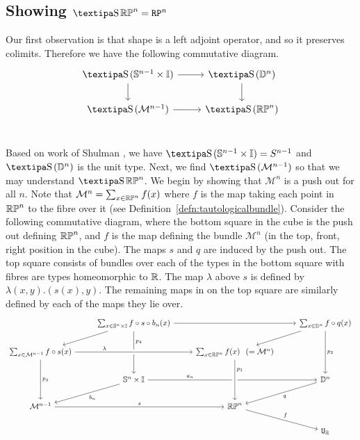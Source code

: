 \documentclass{amsart}
\begin{document}
\subsection{Showing $ \shape \set{RP}^n = \RP^n $}
Our first observation is that shape is a left adjoint operator, and so it preserves colimits. Therefore we have the following commutative diagram.
\[\begin{tikzcd}
\shape(\set{S}^{n-1} \times \set{I}) \arrow[r] \arrow[d] &\shape (\set{D}^{n}) \arrow[d]\\
\shape (\mathcal{M}^{n-1}) \arrow[r] &\shape (\set{RP}^n)\\
\end{tikzcd}
\] 

Based on work of Shulman \cite{shul:bfp}, we have $\shape(\set{S}^{n-1} \times \set{I}) =S^{n-1}$ and $\shape (\set{D}^{n})$ is the unit type. Next, we find $\shape (\mathcal{M}^{n-1})$ so that we may understand $ \shape \set{RP}^n$.  We begin by showing that $\mathcal{M}^{n}$ is a push out for all $n$. Note that $\mathcal{M}^n= \sum _{x \in \mathbb{RP}^n} f(x)$ where $f$ is the map taking each point in $\mathbb{RP}^n$ to the fibre over it (see Definition~\ref{defn:tautologicalbundle}). Consider the following commutative diagram, where the bottom square in the cube is the push out defining $\mathbb{RP}^n$, and $f$ is the map defining the bundle  $ \mathcal{M}^{n}$ (in the top, front, right position in the cube). The maps $s$ and $q$ are induced by the push out. The top square consists of bundles over each of the types in the bottom square with fibres are types homeomorphic to $\mathbb{R}$. The map $\lambda$ above $s$ is defined by $\lambda (x,y). (s(x),y)$. The remaining maps in on the top square are similarly defined by each of the maps they lie over. \\
\begin{equation}
\begin{tikzcd}
																				& \sum_{x \in \set{S}^n \times \set{I}} f \circ s \circ b_n (x) \arrow[rr]	\arrow[ld] \arrow[dd, near start, "p_4"] 	&									& \sum_{x \in \set{D}^n} f \circ q (x) \arrow[ld] \arrow[dd, "p_2"]\\
\sum_{x \in \mathcal{M}^{n-1}}  f \circ s (x) \arrow[rr, crossing over, near start, "\lambda"] \arrow[dd, "p_3"]	&																					& \sum_{x \in \set{RP}^n}f(x)\hspace{0.25cm} (=\mathcal{M}^n)		&	\\
																				& \set{S}^n \times \set{I} \arrow[rr, near start, "a_n"] \arrow[ld, "b_n"]									&									& \set{D}^n \arrow [ld, "q"]\\
\mathcal{M}^{n-1} \arrow[rr, "s" ]														&																					& \set{RP}^n \ar[rd, "f"] 					& \\
																				&																					&									& \U_{\set{R}}\\
\arrow[from=2-3, to=4-3, crossing over, near start, "p_1"]
\end{tikzcd}
\label{cube}
\end{equation}
\end{document}
